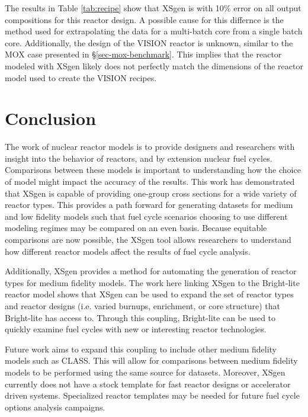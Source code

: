 \documentclass{article}
\begin{document}
The results in Table \ref{tab:recipe} show that XSgen is with 10\% error on all output
compositions for this reactor design. A possible cause for this differnce is the
method used for extrapolating the data for a multi-batch core from a single batch core.
Additionally, the design of the VISION reactor is unknown, similar to the MOX case presented
in \S\ref{sec-mox-benchmark}. This implies that the reactor modeled with XSgen likely does not
perfectly match the dimensions of the reactor model used to create the VISION recipes.

\section{Conclusion}
The work of nuclear reactor models is to provide designers and researchers with insight
into the behavior of reactors, and by extension nuclear fuel cycles. Comparisons between
these models is important to understanding how the choice of model might impact the
accuracy of the results. This work has demonstrated that XSgen is capable of
providing one-group cross sections for a wide variety of reactor types.
This provides a path forward for generating datasets for medium and low fidelity models
such that fuel cycle scenarios choosing to use different modeling regimes may be compared
on an even basis. Because equitable comparisons are now possible, the XSgen tool allows
researchers to understand how different reactor models affect the results of fuel cycle analysis.

Additionally, XSgen provides a method for automating the generation of reactor types for
medium fidelity models. The work here linking XSgen to the Bright-lite reactor model shows
that XSgen can be used to expand the set of reactor types and reactor designs
(i.e. varied burnups, enrichment, or core structure) that Bright-lite has access to.
Through this coupling, Bright-lite can be used to quickly examine fuel cycles with new or
interesting reactor technologies.

Future work aims to expand this coupling to include other medium fidelity models such as CLASS.
This will allow for comparisons between medium fidelity models to be performed using the
same source for datasets. Moreover, XSgen currently does not have a stock template for
fast reactor designs or accelerator driven systems. Specialized reactor templates may be
needed for future fuel cycle options analysis campaigns.



\end{document}
